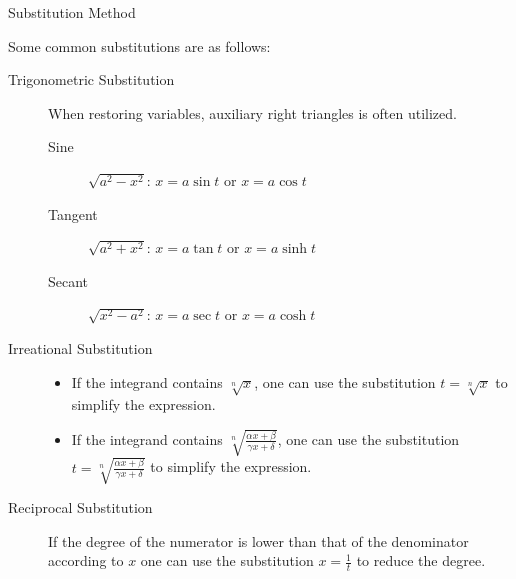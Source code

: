 \documentclass[11pt]{../../TexTemplate/elegantbook}
\begin{document}
\begin{definition}{Substitution Method}
\end{definition}

Some common substitutions are as follows:
\begin{description}
    \item[Trigonometric Substitution] When restoring variables, auxiliary right triangles is often utilized.
        \begin{description}
            \item[Sine] \( \sqrt{a^2 - x^2} \): \( x = a \sin t \) or \( x = a \cos t \)
            \item[Tangent] \( \sqrt{a^2 + x^2} \): \( x = a \tan t \) or \( x = a \sinh t \)
            \item[Secant] \( \sqrt{x^2 - a^2} \): \( x = a \sec t \) or \( x = a \cosh t \)
        \end{description}
    \item[Irreational Substitution] 
        \begin{itemize}
            \item If the integrand contains \( \sqrt[n]{x} \),
                one can use the substitution \( t = \sqrt[n]{x} \) to simplify the expression.
            \item If the integrand contains \( \sqrt[n]{\frac{\alpha x + \beta}{\gamma x + \delta}} \),
                one can use the substitution \( t = \sqrt[n]{\frac{\alpha x + \beta}{\gamma x + \delta}} \) to simplify the expression.
        \end{itemize}
    \item[Reciprocal Substitution] If the degree of the numerator is lower than that of the denominator according to \(x\) 
        one can use the substitution \( x = \frac{1}{t} \) to reduce the degree.
\end{description}
\end{document}
